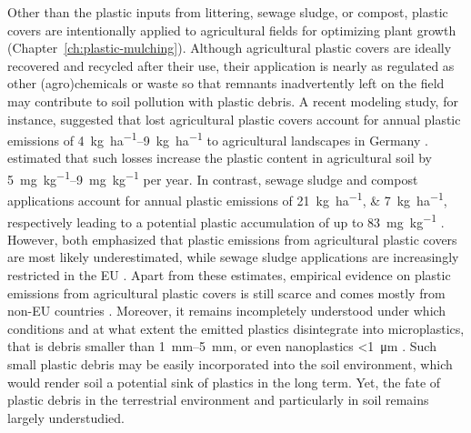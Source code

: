 Other than the plastic inputs from littering, sewage sludge, or compost, plastic covers are intentionally applied to agricultural fields for optimizing plant growth (Chapter~\ref{ch:plastic-mulching}).
Although agricultural plastic covers are ideally recovered and recycled after their use, their application is nearly as regulated as other (agro)chemicals \citep{EUREACHRegulationRegulation2006} or waste \citep{EUWasteFrameworkDirectiveDirective2008} so that remnants inadvertently left on the field may contribute to soil pollution with plastic debris.
A recent modeling study, for instance, suggested that lost agricultural plastic covers account for annual plastic emissions of \SIrange{4}{9}{\kilo\gram\per\hectare} to agricultural landscapes in Germany \citep{BertlingKunststoffe2021}.  estimated that such losses increase the plastic content in agricultural soil by \SIrange{5}{9}{\milli\gram\per\kilo\gram} per year. In contrast, sewage sludge and compost applications account for annual plastic emissions of \SIlist{21;7}{\kilo\gram\per\hectare}, respectively \citep{BertlingKunststoffe2021} leading to a potential plastic accumulation of up to \SI{83}{\milli\gram\per\kilo\gram} \citep{BrandesIdentifying2021}. However, both \citet{BertlingKunststoffe2021,BrandesIdentifying2021} emphasized that plastic emissions from agricultural plastic covers are most likely underestimated, while sewage sludge applications are increasingly restricted in the EU \citep{CollivignarelliLegislation2019}.
Apart from these estimates, empirical evidence on plastic emissions from agricultural plastic covers is still scarce and comes mostly from non-EU countries \citep{HuangAgricultural2020,ZhouMicroplastics2020}.
Moreover, it remains incompletely understood under which conditions and at what extent the emitted plastics disintegrate into microplastics, that is debris smaller than \SIrange{1}{5}{\milli\meter}, or even nanoplastics \SI{<1}{\micro\meter} \citep{HartmannAre2019}. Such small plastic debris may be easily incorporated into the soil environment, which would render soil a potential sink of plastics in the long term. Yet, the fate of plastic debris in the terrestrial environment and particularly in soil remains largely understudied.

